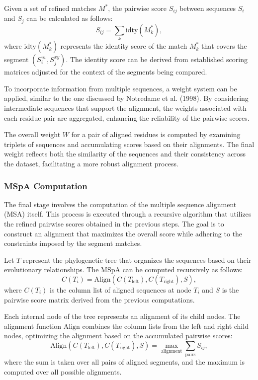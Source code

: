 \documentclass[12pt,oneside,letterpaper,english]{article}
\begin{document}
Given a set of refined matches \( M^* \), the pairwise score \( S_{ij} \) between sequences \( S_i \) 
and \( S_j \) can be calculated as follows:
\[
S_{ij} = \sum_{k} \text{idty}(M_k^{*}),
\]
where \( \text{idty}(M_k^{*}) \) represents the identity score of the match \( M_k^{*} \) that covers the 
segment \( (S_i^{uv}, S_j^{xy}) \). The identity score can be derived from established scoring matrices 
adjusted for the context of the segments being compared.

To incorporate information from multiple sequences, a weight system can be applied, similar to the one 
discussed by Notredame et al. (1998). By considering intermediate sequences that support the alignment, 
the weights associated with each residue pair are aggregated, enhancing the reliability of the pairwise 
scores. 

The overall weight \( W \) for a pair of aligned residues is computed by examining triplets of sequences 
and accumulating scores based on their alignments. The final weight reflects both the similarity of the 
sequences and their consistency across the dataset, facilitating a more robust alignment process.

\subsubsection{MSpA Computation}

The final stage involves the computation of the multiple sequence alignment (MSA) itself. This process is 
executed through a recursive algorithm that utilizes the refined pairwise scores obtained in the previous 
steps. The goal is to construct an alignment that maximizes the overall score while adhering to the 
constraints imposed by the segment matches.

Let \( T \) represent the phylogenetic tree that organizes the sequences based on their evolutionary 
relationships. The MSpA can be computed recursively as follows:
\[
C(T_i) = \text{Align}(C(T_{\text{left}}), C(T_{\text{right}}), S),
\]
where \( C(T_i) \) is the column list of aligned sequences at node \( T_i \) and \( S \) is the pairwise score matrix derived from the previous computations.

Each internal node of the tree represents an alignment of its child nodes. The alignment function 
\( \text{Align} \) combines the column lists from the left and right child nodes, optimizing the alignment 
based on the accumulated pairwise scores:
\[
\text{Align}(C(T_{\text{left}}), C(T_{\text{right}}), S) = \max_{\text{alignment}} \sum_{\text{pairs}} 
S_{ij},
\]
where the sum is taken over all pairs of aligned segments, and the maximum is computed over all possible 
alignments.
\end{document}

